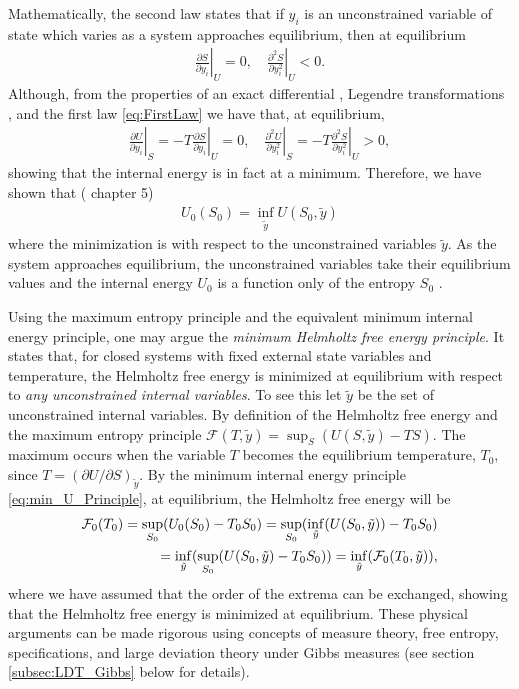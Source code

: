 \documentclass[english,12pt]{ttuthes}
\newcommand{\Fc}{\mathcal{F}}
\begin{document}
Mathematically, the second law states that if $y_i$ is an
unconstrained variable of state which varies as a system approaches
equilibrium, then at equilibrium 
%
\begin{align}
  \left.\frac{\partial S}{\partial y_i}\right|_U=0, \quad
  \left.\frac{\partial^2S}{\partial y_i^2}\right|_U<0.
\end{align}
%
Although, from the properties of an exact differential
\cite{Robertson-1993}, Legendre transformations \cite{Bobbio-2000},
and the first law \eqref{eq:FirstLaw} we have that, at equilibrium,
%
\begin{align}
  \left.\frac{\partial U}{\partial y_i}\right|_S=-T\left.\frac{\partial S}{\partial y_i}\right|_U=0,
  \quad
  \left.\frac{\partial^2U}{\partial y_i^2}\right|_S=-T\left.\frac{\partial^2S}{\partial y_i^2}\right|_U>0,
\end{align}
%
showing that the internal energy is in fact at a minimum. Therefore,
we have shown that (\cite{Callen-1985} chapter 5)
%
\begin{align}\label{eq:min_U_Principle}
  U_0(S_0)=\inf_{\tilde{y}}U(S_0,\tilde{y})
\end{align}
%
where the minimization is with respect to the unconstrained
variables $\tilde{y}$. As the system approaches equilibrium, the
unconstrained variables take their equilibrium values and the internal
energy $U_0$ is a function only of the entropy $S_0$ \cite{Callen-1985}.     

Using the maximum entropy principle and the equivalent minimum
internal energy principle, one may argue the 
\emph{minimum Helmholtz free energy principle}. It 
states that, for closed systems with fixed external state variables and
temperature, the Helmholtz free energy is minimized at equilibrium
with respect to \emph{any unconstrained internal variables}. To see
this let $\tilde{y}$ be the set of unconstrained internal variables. By
definition of the Helmholtz free energy and the maximum entropy
principle $\Fc(T,\tilde{y})=\sup_S(U(S,\tilde{y})-TS)$. The
maximum occurs when the variable $T$ becomes the equilibrium
temperature, $T_0$, since $T=(\partial U/\partial S)_{\tilde{y}}$. By the minimum
internal energy principle \eqref{eq:min_U_Principle}, at equilibrium,
the Helmholtz free energy will be  
%
\begin{align}\label{eq:Min_Free_energy}
  \Fc_0(T_0)=\sup_{S_0}(U_0(S_0)-T_0S_0)
          =\sup_{S_0}(\inf_{\tilde{y}}(U(S_0,\tilde{y}))-T_0S_0)\\
          =\inf_{\tilde{y}}(\sup_{S_0}(U(S_0,\tilde{y})-T_0S_0))
          =\inf_{\tilde{y}}(\Fc_0(T_0,\tilde{y})),\notag
\end{align}
%
where we have assumed that the order of the extrema can be exchanged,
showing that the Helmholtz free energy is minimized at equilibrium.  
These physical arguments \cite{Callen-1985} can be made rigorous using 
concepts of measure theory, free entropy, specifications, and
large deviation theory under Gibbs measures \cite{Firas} (see section
\ref{subsec:LDT_Gibbs} below for details).
\end{document}
